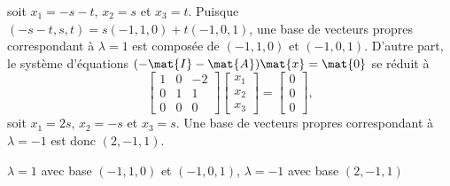 \begin{exercice}
\begin{sol}
      soit $x_1 = -s - t$, $x_2 = s$ et $x_3 = t$. Puisque $(-s - t,
      s, t) = s(-1, 1, 0) + t(-1, 0, 1)$, une base de vecteurs propres
      correspondant à $\lambda = 1$ est composée de $(-1, 1, 0)$ et
      $(-1, 0, 1)$.  D'autre part, le système d'équations $(-\mat{I} -
      \mat{A}) \mat{x} = \mat{0}$ se réduit à
      \begin{displaymath}
        \begin{bmatrix}
          1 & 0 & -2 \\
          0 & 1 &  1 \\
          0 & 0 &  0
        \end{bmatrix}
        \begin{bmatrix} x_1 \\ x_2 \\ x_3 \end{bmatrix} =
        \begin{bmatrix} 0 \\ 0 \\ 0 \end{bmatrix},
      \end{displaymath}
      soit $x_1 = 2s$, $x_2 = -s$ et $x_3 = s$. Une base de vecteurs
      propres correspondant à $\lambda = -1$ est donc $(2, -1, 1)$.
  \end{sol}
  \begin{rep}
    $\lambda =  1$ avec base $(-1, 1, 0)$ et $(-1, 0, 1)$,
    $\lambda = -1$ avec base $(2, -1, 1)$
  \end{rep}
\end{exercice}

